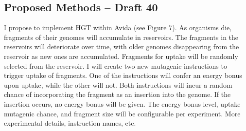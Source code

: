 \subsection{Proposed Methods – Draft 40}

I propose to implement HGT within Avida (see Figure 7).  As organisms die, fragments of their genomes will accumulate in reservoirs.  The fragments in the reservoirs will deteriorate over time, with older genomes disappearing from the reservoir as new ones are accumulated. Fragments for uptake will be randomly selected from the reservoir.  
I will create two new mutagenic instructions to trigger uptake of fragments. One of the instructions will confer an energy bonus upon uptake, while the other will not.  Both instructions will incur a random chance of incorporating the fragment as an insertion into the genome.  If the insertion occurs, no energy bonus will be given. 
The energy bonus level, uptake mutagenic chance, and fragment size will be configurable per experiment. 
More experimental details, instruction names, etc.